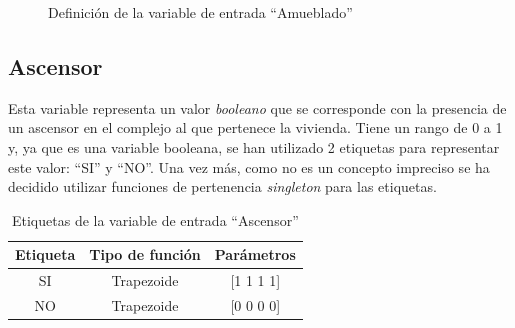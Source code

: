 \documentclass[12pt]{report} %
\begin{document}
        \begin{figure}[H]
            \centering
            \caption{Definición de la variable de entrada ``Amueblado''}
        \end{figure}

        \subsection{Ascensor}
        Esta variable representa un valor \textit{booleano} que se corresponde con la presencia de un ascensor en el complejo al que pertenece la vivienda. 
        Tiene un rango de 0 a 1 y, ya que es una variable booleana, se han utilizado 2 etiquetas para representar este valor: ``SI'' y ``NO''.
        Una vez más, como no es un concepto impreciso se ha decidido utilizar funciones de pertenencia \textit{singleton} para las etiquetas.

        \begin{table}[h]
            \center
            \begin{tabular}{@{}ccc@{}}
                \toprule
                \textbf{Etiqueta} & \textbf{Tipo de función} & \textbf{Parámetros} \\
                \midrule
                SI & Trapezoide & [1 1 1 1] \\
                NO & Trapezoide & [0 0 0 0] \\
                \bottomrule
            \end{tabular}
            \caption{Etiquetas de la variable de entrada ``Ascensor''}
        \end{table}
\end{document}
